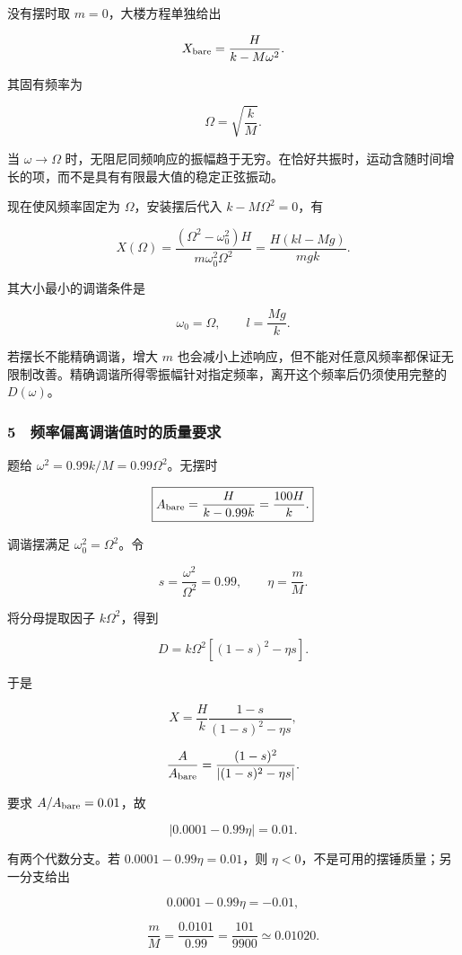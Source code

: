 \documentclass[12pt,a4paper,fontset=fandol]{ctexart}
\begin{document}
没有摆时取 \(m=0\)，大楼方程单独给出

\[X_{\rm bare}=\frac{H}{k-M\omega^2}.\]

其固有频率为

\[\boxed{\Omega=\sqrt{\frac{k}{M}}.}\]

当 \(\omega\to\Omega\)
时，无阻尼同频响应的振幅趋于无穷。在恰好共振时，运动含随时间增长的项，而不是具有有限最大值的稳定正弦振动。

现在使风频率固定为 \(\Omega\)，安装摆后代入 \(k-M\Omega^2=0\)，有

\[X(\Omega)
=\frac{(\Omega^2-\omega_0^2)H}{m\omega_0^2\Omega^2}
=\frac{H(kl-Mg)}{mgk}.\]

其大小最小的调谐条件是

\[\boxed{\omega_0=\Omega,
\qquad l=\frac{Mg}{k}.}\]

若摆长不能精确调谐，增大 \(m\)
也会减小上述响应，但不能对任意风频率都保证无限制改善。精确调谐所得零振幅针对指定频率，离开这个频率后仍须使用完整的
\(D(\omega)\)。

\subsubsection{5　频率偏离调谐值时的质量要求}\label{ux9891ux7387ux504fux79bbux8c03ux8c10ux503cux65f6ux7684ux8d28ux91cfux8981ux6c42}

题给 \(\omega^2=0.99k/M=0.99\Omega^2\)。无摆时

\[\boxed{A_{\rm bare}=\frac{H}{k-0.99k}=\frac{100H}{k}.}\]

调谐摆满足 \(\omega_0^2=\Omega^2\)。令

\[s=\frac{\omega^2}{\Omega^2}=0.99,
\qquad \eta=\frac mM.\]

将分母提取因子 \(k\Omega^2\)，得到

\[D=k\Omega^2[(1-s)^2-\eta s].\]

于是

\[X=\frac Hk\frac{1-s}{(1-s)^2-\eta s},\]

\[\frac{A}{A_{\rm bare}}
=\frac{(1-s)^2}{|(1-s)^2-\eta s|}.\]

要求 \(A/A_{\rm bare}=0.01\)，故

\[|0.0001-0.99\eta|=0.01.\]

有两个代数分支。若 \(0.0001-0.99\eta=0.01\)，则
\(\eta<0\)，不是可用的摆锤质量；另一分支给出

\[0.0001-0.99\eta=-0.01,\]

\[\boxed{\frac mM=\frac{0.0101}{0.99}
=\frac{101}{9900}\simeq0.01020.}\]
\end{document}
